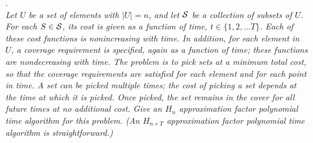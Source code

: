 \documentclass[a4paper,11pt]{article}
\begin{document}
.\\
\emph{Let $U$ be a set of elements with $|U|=n$, and let ${\cal S}$ be a collection of subsets of $U$. 
For each $S \in {\cal S}$, its cost is given as a function of time, $t\in \{ 1 , 2, \ldots T \}$.
Each of these cost functions is nonincreasing with time. 
In addition, for each element in $U$, a coverage requirement is specified, again as a function of time;
these functions are nondecreasing with time. 
The problem is to pick sets at a minimum total cost, 
so that the coverage requirements are satisfied for each element and for each point in time. 
A set can be picked multiple times; 
the cost of picking a set depends at the time at which it is picked. 
Once picked, the set remains in the cover for all future times at no additional cost. 
Give an $H_n$ approximation factor polynomial time algorithm for this problem. 
(An $H_{n\times T}$ approximation factor polynomial time algorithm is straightforward.)} \\
\end{document}
